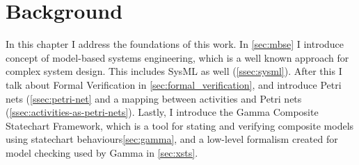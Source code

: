 \chapter{Background}\label{ch:background}

In this chapter I address the foundations of this work. In \autoref{sec:mbse} I introduce concept of model-based systems engineering, which is a well known approach for complex system design. This includes SysML as well (\autoref{ssec:sysml}).  After this I talk about Formal Verification in \autoref{sec:formal_verification}, and introduce Petri nets (\autoref{ssec:petri-net} and a mapping between activities and Petri nets (\autoref{ssec:activities-as-petri-nets}). Lastly, I introduce the Gamma Composite Statechart Framework, which is a tool for stating and verifying composite models using statechart behaviours\autoref{sec:gamma}, and a low-level formalism created for model checking used by Gamma in \autoref{sec:xsts}.





